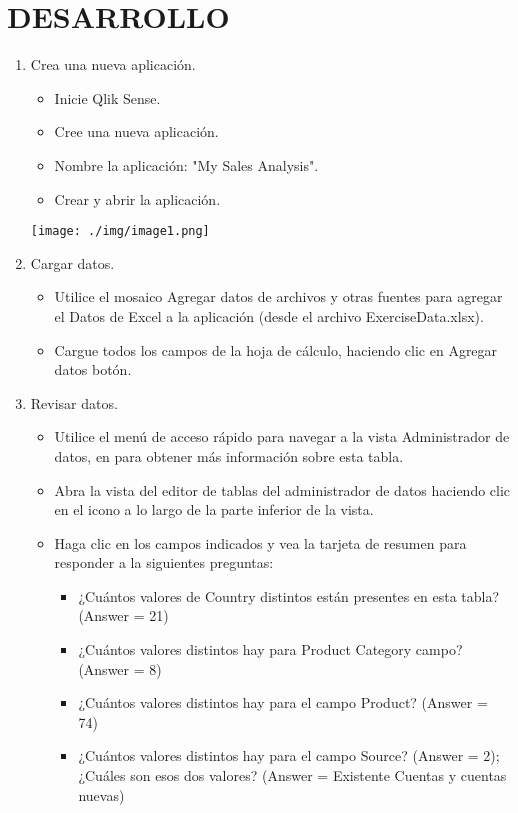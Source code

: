 \documentclass[12pt,letterpaper]{article}
\begin{document}
\section{DESARROLLO}
\begin{enumerate}
    \item Crea una nueva aplicación.
    \begin{itemize}
        \item Inicie Qlik Sense.
        \item Cree una nueva aplicación.
        \item Nombre la aplicación: "My Sales Analysis".
        \item Crear y abrir la aplicación.
    \end{itemize}
        \begin{center}
            \texttt{[image: ./img/image1.png]} 
        \end{center}
    \item Cargar datos.
    \begin{itemize}
        \item Utilice el mosaico Agregar datos de archivos y otras fuentes para agregar el Datos de Excel a la aplicación (desde el archivo ExerciseData.xlsx).
        \item Cargue todos los campos de la hoja de cálculo, haciendo clic en Agregar datos botón.
    \end{itemize}

    \item Revisar datos.
    \begin{itemize}
        \item Utilice el menú de acceso rápido para navegar a la vista Administrador de datos, en para obtener más información sobre esta tabla.
        \item Abra la vista del editor de tablas del administrador de datos haciendo clic en el icono a lo largo de la parte inferior de la vista.
        \item Haga clic en los campos indicados y vea la tarjeta de resumen para responder a la siguientes preguntas:
        \begin{itemize}
            \item ¿Cuántos valores de Country distintos están presentes en esta tabla? (Answer = 21)
            \item ¿Cuántos valores distintos hay para Product Category campo? (Answer = 8)
            \item ¿Cuántos valores distintos hay para el campo Product? (Answer = 74)
            \item ¿Cuántos valores distintos hay para el campo Source? (Answer = 2); ¿Cuáles son esos dos valores? (Answer = Existente Cuentas y cuentas nuevas)
        \end{itemize}
    \end{itemize}


\end{enumerate}
\end{document}

